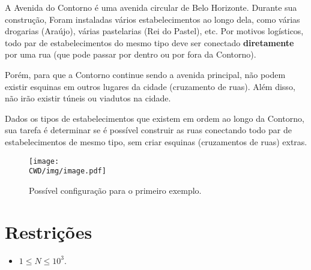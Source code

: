%

A Avenida do Contorno é uma avenida circular de Belo Horizonte. Durante sua construção, Foram instaladas vários estabelecimentos ao longo dela, como várias drogarias (Araújo), várias pastelarias (Rei do Pastel), etc. Por motivos logísticos, todo par de estabelecimentos do mesmo tipo deve ser conectado \textbf{diretamente} por uma rua (que pode passar por dentro ou por fora da Contorno).

Porém, para que a Contorno continue sendo a avenida principal, não podem existir esquinas em outros lugares da cidade (cruzamento de ruas). Além disso, não irão existir túneis ou viadutos na cidade.

Dados os tipos de estabelecimentos que existem em ordem ao longo da Contorno, sua tarefa é determinar se é possível construir as ruas conectando todo par de estabelecimentos de mesmo tipo, sem criar esquinas (cruzamentos de ruas) extras.

\begin{figure}[H]
  \centering
  \texttt{[image: \\CWD/img/image.pdf]}
  \caption{Possível configuração para o primeiro exemplo.}
\end{figure}

%
%

%
%


\section*{Restrições}

\begin{itemize}
\item $1 \leq N \leq 10^3$.
\end{itemize}


\sampleio
